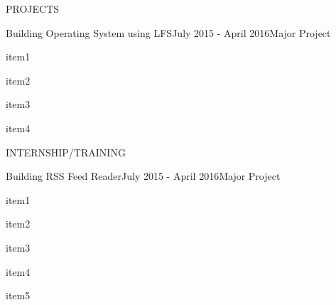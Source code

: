 \documentclass{resume} %
\begin{document}

\begin{rSection}{PROJECTS}

  \begin{rSubsection}
    {Building Operating System using LFS}{July 2015 - April 2016}{Major Project}{}
  \item item1
  \item item2
  \item item3
  \item item4
 
\end{rSubsection} 


\end{rSection} 


\begin{rSection}{INTERNSHIP/TRAINING}

  \begin{rSubsection}
    {Building RSS Feed Reader}{July 2015 - April 2016}{Major Project}{}
  \item item1
  \item item2
  \item item3
  \item item4
  \item item5
 
\end{rSubsection} 


\end{rSection} 





\end{document}
